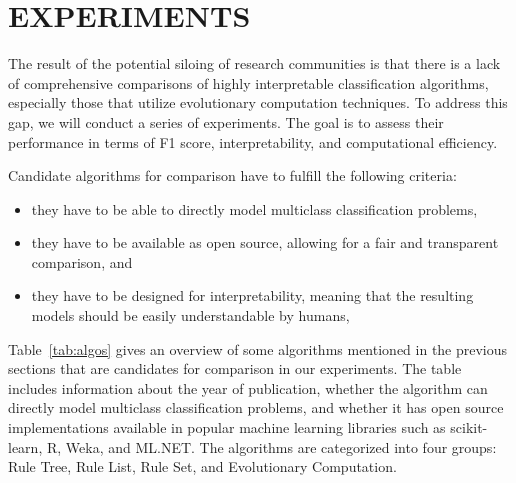\documentclass[a4paper,twoside]{article}
\begin{document}
\section{\uppercase{Experiments}}

The result of the potential siloing of research communities is that there is a lack of comprehensive comparisons of highly interpretable classification algorithms, especially those that utilize evolutionary computation techniques.  
To address this gap, we will conduct a series of experiments. The goal is to assess their performance in terms of F1 score, interpretability, and computational efficiency.

Candidate algorithms for comparison have to fulfill the following criteria: 

\begin{itemize}
  \item they have to be able to directly model multiclass classification problems, %
  \item they have to be available as open source, allowing for a fair and transparent comparison, and
  \item they have to be designed for interpretability, meaning that the resulting models should be easily understandable by humans, 
\end{itemize}

Table~\ref{tab:algos} gives an overview of some algorithms mentioned in the previous sections that are candidates for comparison in our experiments. The table includes information about the year of publication, whether the algorithm can directly model multiclass classification problems, and whether it has open source implementations available in popular machine learning libraries such as scikit-learn, R, Weka, and ML.NET. The algorithms are categorized into four groups: Rule Tree, Rule List, Rule Set, and Evolutionary Computation.
\end{document}
